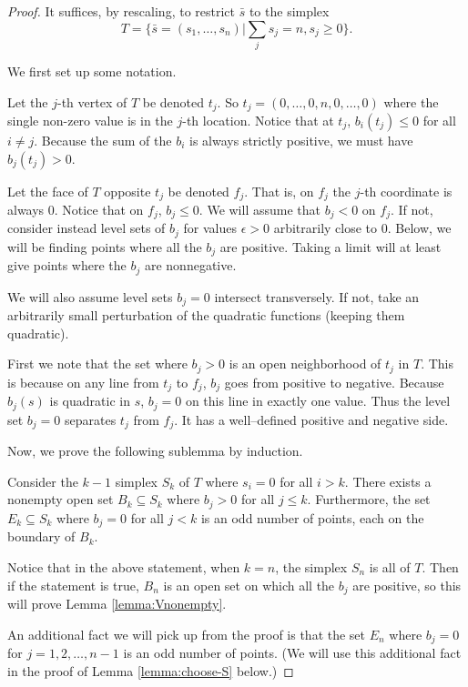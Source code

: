 \begin{proof}
It suffices, by rescaling, to restrict $\bar{s}$ to the simplex
$$T=\{\bar{s}=(s_1, \dots,s_n) | \sum_j s_j = n, s_j \geq 0\}.$$

We first set up some notation.

Let the $j$-th vertex of $T$ be denoted $t_j$.  So $t_j = (0, \dots,
0, n, 0, \dots, 0)$ where the single non-zero value is in the $j$-th
location.  Notice that at $t_j$, $b_i(t_j)\leq 0$ for all $i\neq j$.
Because the sum of the $b_i$ is always strictly positive, we must have
$b_j(t_j)>0$.

Let the face of $T$ opposite $t_j$ be denoted $f_j$.  That is, on
$f_j$ the $j$-th coordinate is always $0$.  Notice that on $f_j$, $b_j
\leq 0$.  We will assume that $b_j < 0$ on $f_j$.  If not, consider
instead level sets of $b_j$ for values $\epsilon > 0$ arbitrarily
close to $0$.  Below, we will be finding points where all the $b_j$
are positive.  Taking a limit will at least give points where the
$b_j$ are nonnegative.

We will also assume level sets $b_j=0$ intersect transversely.  If
not, take an arbitrarily small perturbation of the quadratic functions
(keeping them quadratic).

First we note that the set where $b_j>0$ is an open neighborhood of
$t_j$ in $T$.  This is because on any line from $t_j$ to $f_j$, $b_j$
goes from positive to negative.  Because $b_j(s)$ is quadratic in $s$,
$b_j=0$ on this line in exactly one value.  Thus the level set $b_j=0$
separates $t_j$ from $f_j$.  It has a well--defined positive and
negative side.

Now, we prove the following sublemma by induction.

\begin{lemma}
  Consider the $k-1$ simplex $S_k$ of $T$ where $s_i=0$ for all $i>k$.
  There exists a nonempty open set $B_k \subseteq S_k$ where $b_j>0$
  for all $j\leq k$.  Furthermore, the set $E_k\subseteq S_k$ where
  $b_j=0$ for all $j<k$ is an odd number of points, each on the
  boundary of $B_k$.  
\label{lemma:sub-vnonempty}
\end{lemma}

Notice that in the above statement, when $k=n$, the simplex $S_n$ is
all of $T$.  Then if the statement is true, $B_n$ is an open set on
which all the $b_j$ are positive, so this will prove Lemma
\ref{lemma:Vnonempty}. 

An additional fact we will pick up from the proof is that the set
$E_n$ where $b_j=0$ for $j=1, 2, \dots, n-1$ is an odd number of
points.  (We will use this additional fact in the proof of Lemma
\ref{lemma:choose-S} below.)


\end{proof}
